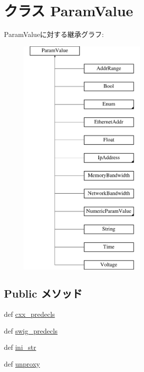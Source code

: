 \hypertarget{classm5_1_1params_1_1ParamValue}{
\section{クラス ParamValue}
\label{classm5_1_1params_1_1ParamValue}
}
ParamValueに対する継承グラフ:\begin{figure}[H]
\begin{center}
\leavevmode
\includegraphics[height=12cm]{classm5_1_1params_1_1ParamValue}
\end{center}
\end{figure}
\subsection*{Public メソッド}
\begin{DoxyCompactItemize}
\item 
def \hyperlink{classm5_1_1params_1_1ParamValue_a0b408a11a14bd1d770e28f71a6e14ab5}{cxx\_\-predecls}
\item 
def \hyperlink{classm5_1_1params_1_1ParamValue_ab3dbcf5716623eac67a8ccc074fa7e13}{swig\_\-predecls}
\item 
def \hyperlink{classm5_1_1params_1_1ParamValue_a33ebe6cd32bcbd15465fc28b9d94bf82}{ini\_\-str}
\item 
def \hyperlink{classm5_1_1params_1_1ParamValue_a587cd3c1e899640dc09d63793aa8093b}{unproxy}
\end{DoxyCompactItemize}
